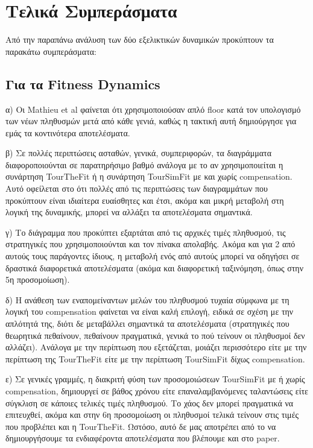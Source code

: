 \documentclass[12pt]{article}
\begin{document}
\clearpage
\section{Τελικά Συμπεράσματα}
Από την παραπάνω ανάλυση των δύο εξελικτικών δυναμικών προκύπτουν τα παρακάτω συμπεράσματα:

\subsection*{Για τα Fitness Dynamics}
α) Οι Mathieu et al φαίνεται ότι χρησιμοποιούσαν απλό floor κατά τον υπολογισμό των νέων πληθυσμών μετά από κάθε γενιά, καθώς η τακτική αυτή δημιούργησε για εμάς τα κοντινότερα αποτελέσματα.

β) Σε πολλές περιπτώσεις ασταθών, γενικά, συμπεριφορών, τα διαγράμματα διαφοροποιούνται σε παρατηρήσιμο βαθμό ανάλογα με το αν χρησιμοποιείται η συνάρτηση TourTheFit ή η συνάρτηση TourSimFit με και χωρίς compensation. Αυτό οφείλεται στο ότι πολλές από τις περιπτώσεις των διαγραμμάτων που προκύπτουν είναι ιδιαίτερα ευαίσθητες και έτσι, ακόμα και μικρή μεταβολή στη λογική της δυναμικής, μπορεί να αλλάξει τα αποτελέσματα σημαντικά.

γ) Το διάγραμμα που προκύπτει εξαρτάται από τις αρχικές τιμές πληθυσμού, τις στρατηγικές που χρησιμοποιούνται και τον πίνακα απολαβής. Ακόμα και για 2 από αυτούς τους παράγοντες ίδιους, η μεταβολή ενός από αυτούς μπορεί να οδηγήσει σε δραστικά διαφορετικά αποτελέσματα (ακόμα και διαφορετική ταξινόμηση, όπως στην 5η προσομοίωση).

δ) Η ανάθεση των εναπομείναντων μελών του πληθυσμού τυχαία σύμφωνα με τη λογική του compensation φαίνεται να είναι καλή επιλογή, ειδικά σε σχέση με την απλότητά της, διότι δε μεταβάλλει σημαντικά τα αποτελέσματα (στρατηγικές που θεωρητικά πεθαίνουν, πεθαίνουν πραγματικά, γενικά το πού τείνουν οι πληθυσμοί δεν αλλάζει). Ανάλογα με την περίπτωση που εξετάζεται, μοιάζει περισσότερο είτε με την περίπτωση της TourTheFit είτε με την περίπτωση TourSimFit δίχως compensation.

ε) Σε γενικές γραμμές, η διακριτή φύση των προσομοιώσεων TourSimFit με ή χωρίς compensation, δημιουργεί σε βάθος χρόνου είτε επαναλαμβανόμενες ταλαντώσεις είτε σύγκλιση σε κάποιες τελικές τιμές πληθυσμού. Το χάος δεν μπορεί πραγματικά να επιτευχθεί, ακόμα και στην 6η προσομοίωση οι πληθυσμοί τελικά τείνουν στις τιμές που προβλέπει και η TourTheFit. Ωστόσο, αυτό δε μας αποτρέπει από το να δημιουργήσουμε τα ενδιαφέροντα αποτελέσματα που βλέπουμε και στο paper.
\end{document}
